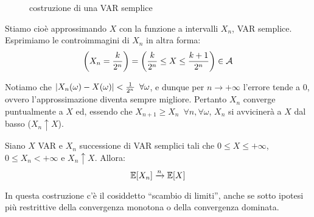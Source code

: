 \begin{oss}
\begin{figure}[ht]
    \label{costruzone-var-semplice}
    \caption{costruzione di una VAR semplice}
  \end{figure}
  Stiamo cioè approssimando $X$ con la funzione a intervalli $X_n$, VAR semplice. Esprimiamo le controimmagini di $X_n$ in altra forma:
  $$
    \left(X_n = \frac k {2^n}\right)
    = \left(\frac k {2^n} \le X \le \frac {k+1} {2^n}\right) \in \mathcal A
  $$

  Notiamo che $\lvert X_n(\omega) - X(\omega)\rvert < \frac 1 {2^n} \enspace \forall \omega$, e dunque per $n \to +\infty$ l'errore tende a 0, ovvero l'approssimazione diventa sempre migliore.
  Pertanto $X_n$ converge puntualmente a $X$ ed, essendo che $X_{n+1} \ge X_n \enspace\forall n, \forall\omega$,
  $X_n$ si avvicinerà a $X$ dal basso ($X_n \uparrow X$).
\end{oss}
\medskip
\begin{lemma}\label{lemma-conv-VA-sempl}
  Siano $X$ VAR e $X_n$ successione di VAR semplici tali che $0 \le X \le +\infty$, $0 \le X_n < +\infty$ e $X_n \uparrow X$.
  Allora:
  $$\mathbb E[X_n] \xrightarrow{n} \mathbb E[X]$$
\end{lemma}
In questa costruzione c'è il cosiddetto ``scambio di limiti'', anche se sotto ipotesi più restrittive della convergenza monotona o della convergenza dominata.

